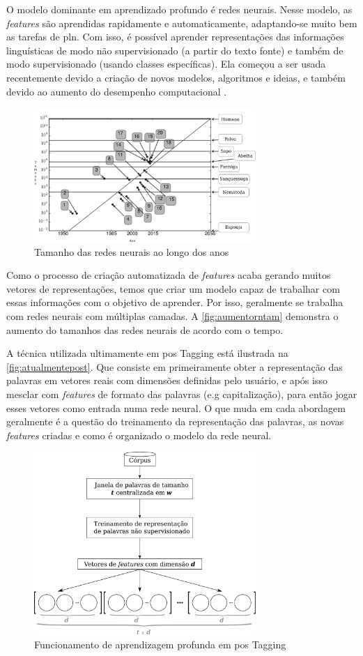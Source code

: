 O modelo dominante em aprendizado profundo é redes neurais. Nesse modelo, as \textit{features} são aprendidas rapidamente e automaticamente, adaptando-se muito bem as tarefas de \ac{pln}. Com isso, é possível aprender representações das informações linguísticas de modo não supervisionado (a partir do texto fonte) e também de modo supervisionado (usando classes específicas). Ela começou a ser usada recentemente devido a criação de novos modelos, algoritmos e ideias, e também devido ao aumento do desempenho computacional \cite{deeplearningfornlp}.

\begin{figure}
\centering
\caption{Tamanho das redes neurais ao longo dos anos} \label{fig:aumentorntam}
\includegraphics[width=0.75\textwidth]{img/aumentorntam.pdf}
\end{figure}

Como o processo de criação automatizada de \textit{features} acaba gerando muitos vetores de representações, temos que criar um modelo capaz de trabalhar com essas informações com o objetivo de aprender. Por isso, geralmente se trabalha com redes neurais com múltiplas camadas. A \autoref{fig:aumentorntam} demonstra o aumento do tamanhos das redes neurais de acordo com o tempo. 

A técnica utilizada ultimamente em \ac{pos} Tagging está ilustrada na \autoref{fig:atualmentepost}. Que consiste em primeiramente obter a representação das palavras em vetores reais com dimensões definidas pelo usuário, e após isso mesclar com \textit{features} de formato das palavras (e.g capitalização), para então jogar esses vetores como entrada numa rede neural. O que muda em cada abordagem geralmente é a questão do treinamento da representação das palavras, as novas \textit{features} criadas e como é organizado o modelo da rede neural.

\begin{figure}
\centering
\caption{Funcionamento de aprendizagem profunda em \ac{pos} Tagging} \label{fig:atualmentepost}
\includegraphics[width=0.75\textwidth]{img/deeplearningfunc}
\end{figure}


